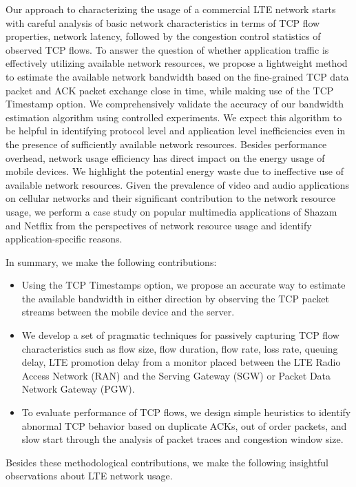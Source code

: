 Our approach to characterizing the usage of a commercial LTE network
starts with careful analysis of basic network characteristics in terms
of TCP flow properties, network latency, followed by the congestion
control statistics of observed TCP flows. To answer the question of
whether application traffic is effectively utilizing available network
resources, we propose a lightweight method to estimate the available
network bandwidth based on the fine-grained TCP data packet and ACK
packet exchange close in time, while making use of the TCP Timestamp
option. We comprehensively validate the accuracy of our bandwidth estimation
algorithm using controlled experiments. We expect this algorithm to be
helpful in identifying protocol level and application level
inefficiencies even in the presence of sufficiently available network
resources.  Besides performance overhead, network usage efficiency has
direct impact on the energy usage of mobile devices.
We highlight the potential energy waste due to ineffective use of available network resources.
Given the prevalence of video and audio applications on
cellular networks and their significant contribution to the network
resource usage, we perform a case study on popular multimedia
applications of Shazam and Netflix from the perspectives of
network resource usage and identify application-specific reasons.

In summary, we make the following contributions:
\begin{itemize}
\item Using the TCP Timestamps option, we propose an accurate way to estimate the
available bandwidth in either direction by observing the TCP packet
streams between the mobile device and the server.
\item We develop a set of pragmatic techniques for passively capturing TCP flow
characteristics such as flow size, flow duration, flow rate, loss rate, queuing delay, LTE promotion delay
from a monitor placed between the LTE Radio Access Network (RAN) and
the Serving Gateway (SGW) or Packet Data Network Gateway (PGW).
\item To evaluate performance of TCP flows, we design simple
heuristics to identify abnormal TCP behavior based on duplicate ACKs,
out of order packets, and slow start through the analysis of packet
traces and congestion window size.
\end{itemize}

Besides these methodological contributions, we make the following
insightful observations about LTE network usage.

